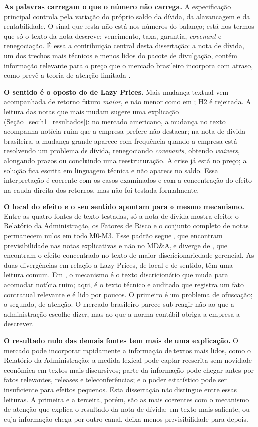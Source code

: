 \documentclass[a4paper,12pt]{report}
\begin{document}
\textbf{As palavras carregam o que o número não carrega.} A especificação principal controla pela variação do próprio saldo da dívida, da alavancagem e da rentabilidade. O sinal que resta não está nos números do balanço; está nos termos que só o texto da nota descreve: vencimento, taxa, garantia, \textit{covenant} e renegociação. É essa a contribuição central desta dissertação: a nota de dívida, um dos trechos mais técnicos e menos lidos do pacote de divulgação, contém informação relevante para o preço que o mercado brasileiro incorpora com atraso, como prevê a teoria de atenção limitada \cite{hirshleifer2011}.

\textbf{O sentido é o oposto do de Lazy Prices.} Mais mudança textual vem acompanhada de retorno futuro \emph{maior}, e não menor como em ; H2 é rejeitada. A leitura das notas que mais mudam sugere uma explicação (Seção~\ref{sec:h1_resultados}): no mercado americano, a mudança no texto acompanha notícia ruim que a empresa prefere não destacar; na nota de dívida brasileira, a mudança grande aparece com frequência quando a empresa está resolvendo um problema de dívida, renegociando \textit{covenants}, obtendo \textit{waivers}, alongando prazos ou concluindo uma reestruturação. A crise já está no preço; a solução fica escrita em linguagem técnica e não aparece no saldo. Essa interpretação é coerente com os casos examinados e com a concentração do efeito na cauda direita dos retornos, mas não foi testada formalmente.

\textbf{O local do efeito e o seu sentido apontam para o mesmo mecanismo.} Entre as quatro fontes de texto testadas, só a nota de dívida mostra efeito; o Relatório da Administração, os Fatores de Risco e o conjunto completo de notas permanecem nulos em todo M0-M3. Esse padrão segue , que encontram previsibilidade nas notas explicativas e não no MD\&A, e diverge de , que encontram o efeito concentrado no texto de maior discricionariedade gerencial. As duas divergências em relação a Lazy Prices, de local e de sentido, têm uma leitura comum. Em , o mecanismo é o texto discricionário que muda para acomodar notícia ruim; aqui, é o texto técnico e auditado que registra um fato contratual relevante e é lido por poucos. O primeiro é um problema de ofuscação; o segundo, de atenção. O mercado brasileiro parece sub-reagir não ao que a administração escolhe dizer, mas ao que a norma contábil obriga a empresa a descrever.

\textbf{O resultado nulo das demais fontes tem mais de uma explicação.} O mercado pode incorporar rapidamente a informação de textos mais lidos, como o Relatório da Administração; a medida lexical pode captar reescrita sem novidade econômica em textos mais discursivos; parte da informação pode chegar antes por fatos relevantes, releases e teleconferências; e o poder estatístico pode ser insuficiente para efeitos pequenos. Esta dissertação não distingue entre essas leituras. A primeira e a terceira, porém, são as mais coerentes com o mecanismo de atenção que explica o resultado da nota de dívida: um texto mais saliente, ou cuja informação chega por outro canal, deixa menos previsibilidade para depois.
\end{document}
